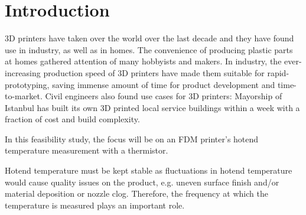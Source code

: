 \section{Introduction}

3D printers have taken over the world over the last decade and
they have
found use in industry, as well as in homes. The convenience of producing
plastic parts at homes gathered attention of many hobbyists and makers. In
industry, the ever-increasing production speed of 3D printers have made
them suitable for rapid-prototyping, saving immense amount of time for
product development and time-to-market. Civil engineers also found use
cases for 3D printers: Mayorship of Istanbul has built its own 3D printed
local service buildings within a week with a fraction of cost and build
complexity.

In this feasibility study, the focus will be on an FDM printer's hotend
temperature measurement with a thermistor.

Hotend temperature must be kept stable as fluctuations in hotend
temperature would cause quality issues on the product, e.g. uneven surface
finish and/or material deposition or nozzle clog. Therefore, the frequency
at which the temperature is measured plays an important role.